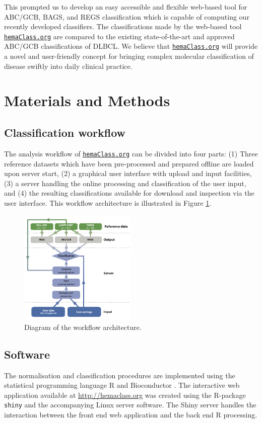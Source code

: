 \documentclass{article}
\newcommand{\hemaClass}{\href{http://hemaClass.org}{\texttt{hemaClass.org}}}
\begin{document}
This prompted us to develop an easy accessible and flexible web-based tool for ABC/GCB, BAGS, and REGS classification which is capable of computing our recently developed classifiers.
The classifications made by the web-based tool \hemaClass{} are compared to the existing state-of-the-art and approved ABC/GCB classifications of DLBCL.
We believe that \hemaClass{} will provide a novel and user-friendly concept for bringing complex molecular classification of disease swiftly into daily clinical practice.


\section{Materials and Methods}

\subsection{Classification workflow}
The analysis workflow of \hemaClass{} can be divided into four parts: (1) Three reference datasets which have been pre-processed and prepared offline are loaded upon server start, (2) a graphical user interface with upload and input facilities, (3) a server handling the online processing and classification of the user input, and (4) the resulting classifications available for download and inspection via the user interface.
This workflow architecture is illustrated in Figure \ref{fig:webtooldiagram}.

\begin{figure}
\begin{center}
\includegraphics[width=0.5\textwidth]{Flowchart6.pdf}
\end{center}
\caption{Diagram of the workflow architecture.}
\label{fig:webtooldiagram}
\end{figure}

\subsection{Software}
The normalisation and classification procedures are implemented using the statistical programming language R \citep{RCoreTeam2013} and Bioconductor \citep{Gentleman2004}.
The interactive web application available at \url{http://hemaclass.org} was created using the R-package \texttt{shiny} \citep{RStudio2013} and the accompanying Linux server software.
The Shiny server handles the interaction between the front end web application and the back end R processing.
\end{document}

